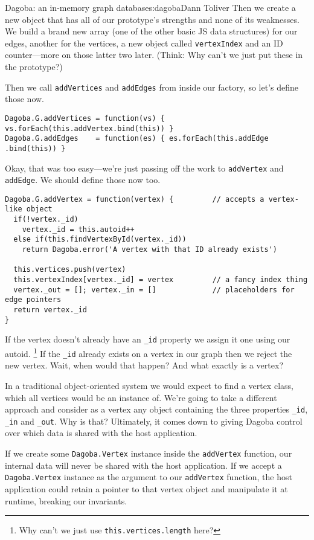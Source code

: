 \begin{aosachapter}{Dagoba: an in-memory graph database}{s:dagoba}{Dann Toliver}
Then we create a new object that has all of our prototype's strengths
and none of its weaknesses. We build a brand new array (one of the other
basic JS data structures) for our edges, another for the vertices, a new
object called \texttt{vertexIndex} and an ID counter---more on those
latter two later. (Think: Why can't we just put these in the prototype?)

Then we call \texttt{addVertices} and \texttt{addEdges} from inside our
factory, so let's define those now.

\begin{verbatim}
Dagoba.G.addVertices = function(vs) { vs.forEach(this.addVertex.bind(this)) }
Dagoba.G.addEdges    = function(es) { es.forEach(this.addEdge  .bind(this)) }
\end{verbatim}

Okay, that was too easy---we're just passing off the work to
\texttt{addVertex} and \texttt{addEdge}. We should define those now too.

\begin{verbatim}
Dagoba.G.addVertex = function(vertex) {         // accepts a vertex-like object
  if(!vertex._id)
    vertex._id = this.autoid++
  else if(this.findVertexById(vertex._id))
    return Dagoba.error('A vertex with that ID already exists')

  this.vertices.push(vertex)
  this.vertexIndex[vertex._id] = vertex         // a fancy index thing
  vertex._out = []; vertex._in = []             // placeholders for edge pointers
  return vertex._id
}
\end{verbatim}

If the vertex doesn't already have an \texttt{\_id} property we assign
it one using our autoid. \footnote{Why can't we just use
  \texttt{this.vertices.length} here?} If the \texttt{\_id} already
exists on a vertex in our graph then we reject the new vertex. Wait,
when would that happen? And what exactly is a vertex?

In a traditional object-oriented system we would expect to find a vertex
class, which all vertices would be an instance of. We're going to take a
different approach and consider as a vertex any object containing the
three properties \texttt{\_id}, \texttt{\_in} and \texttt{\_out}. Why is
that? Ultimately, it comes down to giving Dagoba control over which data
is shared with the host application.

If we create some \texttt{Dagoba.Vertex} instance inside the
\texttt{addVertex} function, our internal data will never be shared with
the host application. If we accept a \texttt{Dagoba.Vertex} instance as
the argument to our \texttt{addVertex} function, the host application
could retain a pointer to that vertex object and manipulate it at
runtime, breaking our invariants.


\end{aosachapter}
